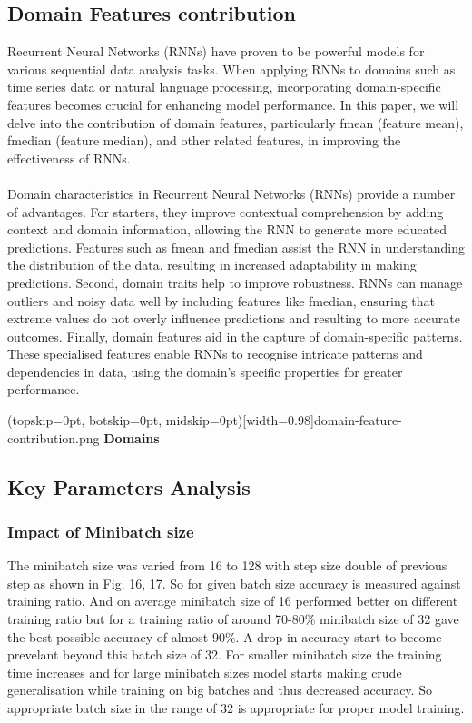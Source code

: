 \documentclass{ieeeaccess}
\begin{document}
\subsection{Domain Features contribution}
Recurrent Neural Networks (RNNs) have proven to be powerful models for various sequential data analysis tasks. When applying RNNs to domains such as time series data or natural language processing, incorporating domain-specific features becomes crucial for enhancing model performance. In this paper, we will delve into the contribution of domain features, particularly fmean (feature mean), fmedian (feature median), and other related features, in improving the effectiveness of RNNs.
\\
\\
Domain characteristics in Recurrent Neural Networks (RNNs) provide a number of advantages. For starters, they improve contextual comprehension by adding context and domain information, allowing the RNN to generate more educated predictions. Features such as fmean and fmedian assist the RNN in understanding the distribution of the data, resulting in increased adaptability in making predictions. Second, domain traits help to improve robustness. RNNs can manage outliers and noisy data well by including features like fmedian, ensuring that extreme values do not overly influence predictions and resulting to more accurate outcomes. Finally, domain features aid in the capture of domain-specific patterns. These specialised features enable RNNs to recognise intricate patterns and dependencies in data, using the domain's specific properties for greater performance.

\Figure[t!](topskip=0pt, botskip=0pt, midskip=0pt)[width=0.98\linewidth]{domain-feature-contribution.png}
{ \textbf{Domains}\label{fig15}}

\subsection{Key Parameters Analysis}
\subsubsection{Impact of Minibatch size}
The minibatch size was varied from 16 to 128 with step size double of previous step as shown in Fig. 16, 17. So for given batch size accuracy is measured against training ratio. And on average minibatch size of 16 performed better on different training ratio but for a training ratio of around 70-80\% minibatch size of 32 gave the best possible accuracy of almost 90\%. A drop in accuracy start to become prevelant beyond this batch size of 32. For smaller minibatch size the training time increases and for large minibatch sizes model starts making crude generalisation while training on big batches and thus decreased accuracy. So appropriate batch size in the range of 32 is appropriate for proper model training.
\end{document}
